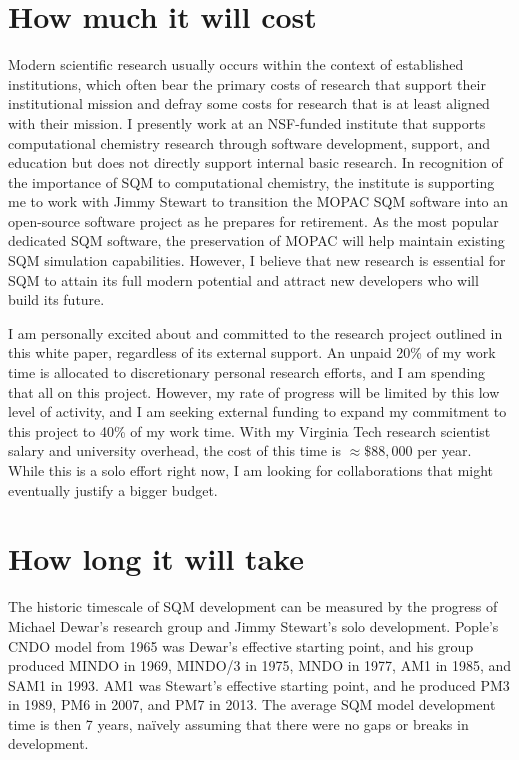 \documentclass[12pt]{article}
\begin{document}
\section{How much it will cost}

Modern scientific research usually occurs within the context of established institutions, which often
 bear the primary costs of research that support their institutional mission
 and defray some costs for research that is at least aligned with their mission.
I presently work at an NSF-funded institute that supports computational chemistry research through software development, support, and education
 but does not directly support internal basic research.
In recognition of the importance of SQM to computational chemistry,
 the institute is supporting me to work with Jimmy Stewart to transition the MOPAC SQM software into an open-source software project
 as he prepares for retirement.
As the most popular dedicated SQM software, the preservation of MOPAC will help maintain existing SQM simulation capabilities.
However, I believe that new research is essential for SQM to attain its full modern potential and attract new developers who will build its future.

I am personally excited about and committed to the research project outlined in this white paper, regardless of its external support.
An unpaid 20\% of my work time is allocated to discretionary personal research efforts,
 and I am spending that all on this project.
However, my rate of progress will be limited by this low level of activity, and I am seeking external funding to expand my commitment to this project to 40\% of my work time.
With my Virginia Tech research scientist salary and university overhead, the cost of this time is $\approx \$88,000$ per year.
While this is a solo effort right now, I am looking for collaborations that might eventually justify a bigger budget.

\section{How long it will take}

The historic timescale of SQM development can be measured by the progress of Michael Dewar's research group and Jimmy Stewart's solo development.
Pople's CNDO model from 1965 was Dewar's effective starting point, and his group produced MINDO in 1969, MINDO/3 in 1975, MNDO in 1977, AM1 in 1985, and SAM1 in 1993.
AM1 was Stewart's effective starting point, and he produced PM3 in 1989, PM6 in 2007, and PM7 in 2013.
The average SQM model development time is then 7 years, na\"ively assuming that there were no gaps or breaks in development.
\end{document}
